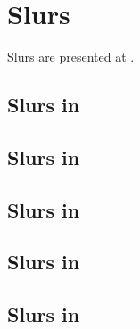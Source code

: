 



\chapter{Slurs}\label{Slurs}

Slurs are presented at .


\section{Slurs in \mxsrToMsr{}}


\section{Slurs in \mxsrToMsr{}}


\section{Slurs in \msrToMsr{}}


\section{Slurs in \msrToLpsr{}}


\section{Slurs in \lpsrToLilypond{}}


